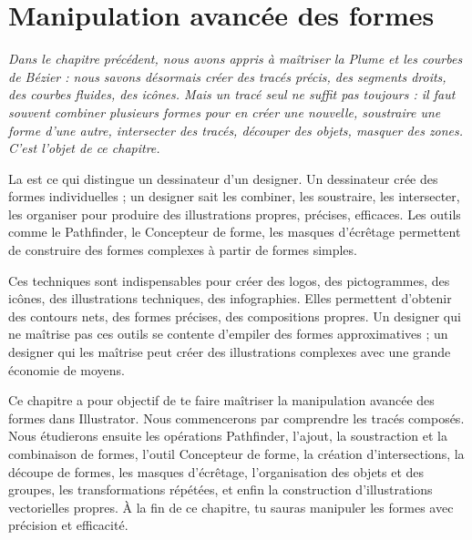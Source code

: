 
\chapter{Manipulation avancée des formes}

\noindent
\textit{Dans le chapitre précédent, nous avons appris à maîtriser la Plume et les courbes de Bézier : nous savons désormais créer des tracés précis, des segments droits, des courbes fluides, des icônes. Mais un tracé seul ne suffit pas toujours : il faut souvent \emph{combiner} plusieurs formes pour en créer une nouvelle, \emph{soustraire} une forme d'une autre, \emph{intersecter} des tracés, \emph{découper} des objets, \emph{masquer} des zones. C'est l'objet de ce chapitre.}

\vspace{1em}

\noindent
La  est ce qui distingue un dessinateur d'un designer. Un dessinateur crée des formes individuelles ; un designer sait les combiner, les soustraire, les intersecter, les organiser pour produire des illustrations propres, précises, efficaces. Les outils comme le Pathfinder, le Concepteur de forme, les masques d'écrêtage permettent de construire des formes complexes à partir de formes simples.

\vspace{1em}

\noindent
Ces techniques sont indispensables pour créer des logos, des pictogrammes, des icônes, des illustrations techniques, des infographies. Elles permettent d'obtenir des contours nets, des formes précises, des compositions propres. Un designer qui ne maîtrise pas ces outils se contente d'empiler des formes approximatives ; un designer qui les maîtrise peut créer des illustrations complexes avec une grande économie de moyens.

\vspace{1em}

\noindent
Ce chapitre a pour objectif de te faire maîtriser la manipulation avancée des formes dans Illustrator. Nous commencerons par comprendre les tracés composés. Nous étudierons ensuite les opérations Pathfinder, l'ajout, la soustraction et la combinaison de formes, l'outil Concepteur de forme, la création d'intersections, la découpe de formes, les masques d'écrêtage, l'organisation des objets et des groupes, les transformations répétées, et enfin la construction d'illustrations vectorielles propres. À la fin de ce chapitre, tu sauras manipuler les formes avec précision et efficacité.

